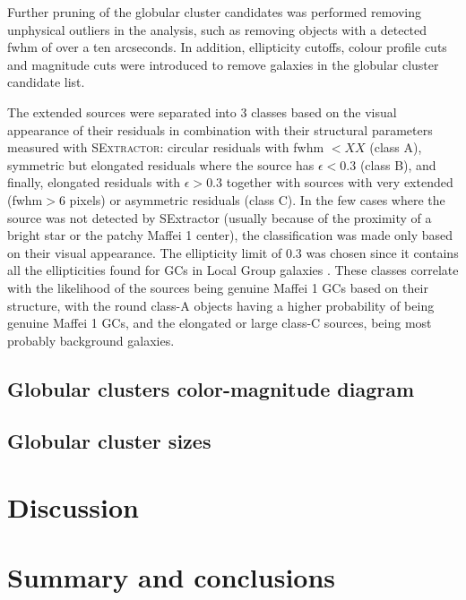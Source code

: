 \documentclass[useAMS,usenatbib]{mn2e}
\begin{document}
Further pruning of the globular cluster candidates was performed removing unphysical outliers in the analysis, such as removing objects with a detected fwhm of over a ten arcseconds. In addition, ellipticity cutoffs, colour profile cuts and magnitude cuts were introduced to remove galaxies in the globular cluster candidate list. 



{\color{blue} The extended sources were separated into 3 classes based on the visual
appearance of their residuals in combination with their structural
parameters measured with \textsc{SExtractor}: circular residuals with
fwhm $< XX$ (class A), symmetric but elongated residuals where the
source has $\epsilon< 0.3$ (class B), and finally, elongated residuals
with $\epsilon > 0.3$ together with sources with very extended (fwhm$
> 6$ pixels) or asymmetric residuals (class C). In the few cases where
the source was not detected by SExtractor (usually because of the
proximity of a bright star or the patchy Maffei 1 center), the
classification was made only based on their visual appearance. The
ellipticity limit of 0.3 was chosen since it contains all the
ellipticities found for GCs in Local Group galaxies
\citep[e.g.][]{vdb08}. These classes correlate with the likelihood of
the sources being genuine Maffei 1 GCs based on their structure, with
the round class-A objects having a higher probability of being genuine
Maffei 1 GCs, and the elongated or large class-C sources, being most
probably background galaxies.}



\subsection{Globular clusters color-magnitude diagram}
\label{sec:gc_cmd}

\subsection{Globular cluster sizes}
\label{sec:gc_sizes}


\section{Discussion}
\label{sec:discussion}

\section{Summary and conclusions}
\label{sec:conclusions}
\end{document}

